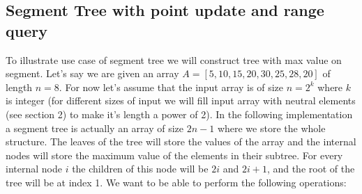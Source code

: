 \documentclass{article}
\begin{document}
\subsection{Segment Tree with point update and range query}
To illustrate use case of segment tree we will construct tree with max value on segment.
Let's say we are given an array \(A = [5, 10, 15, 20, 30, 25, 28, 20]\) of length \(n = 8\).
For now let's assume that the input array is of size \(n = 2^{k}\) where \(k\) is integer (for different
sizes of input we will fill input array with neutral elements (see section 2) to make it's length a power of 2).
In the following implementation a segment tree is actually an array of size \(2n - 1\) where we store the whole structure.
The leaves of the tree will store the values of the array and the internal nodes will store the maximum value of the elements in their subtree.
For every internal node \(i\) the children of this node will be \(2i\) and \(2i + 1\), and the root of the tree will be at index 1.
We want to be able to perform the following operations:
\end{document}
